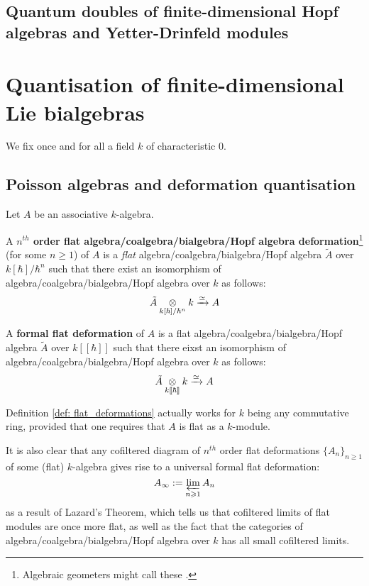     \subsection{Quantum doubles of finite-dimensional Hopf algebras and Yetter-Drinfeld modules}
    
\section{Quantisation of finite-dimensional Lie bialgebras}
    \begin{convention}
        We fix once and for all a field $k$ of characteristic $0$. 
    \end{convention}
    
    \subsection{Poisson algebras and deformation quantisation}
        \begin{definition} \label{def: flat_deformations}
            Let $A$ be an associative $k$-algebra.
            
            A \textbf{$n^{th}$ order flat algebra/coalgebra/bialgebra/Hopf algebra deformation}\footnote{Algebraic geometers might call these .} (for some $n \geq 1$) of $A$ is a \textit{flat} algebra/coalgebra/bialgebra/Hopf algebra $\tilde{A}$ over $k[\hbar]/\hbar^n$ such that there exist an isomorphism of algebra/coalgebra/bialgebra/Hopf algebra over $k$ as follows:
                $$\tilde{A} \tensor_{k[\hbar]/\hbar^n} k \xrightarrow[]{\cong} A$$
                
            A \textbf{formal flat deformation} of $A$ is a flat algebra/coalgebra/bialgebra/Hopf algebra $\tilde{A}$ over $k[\![\hbar]\!]$ such that there eixst an isomorphism of algebra/coalgebra/bialgebra/Hopf algebra over $k$ as follows:
                $$\tilde{A} \tensor_{k[\![\hbar]\!]} k \xrightarrow[]{\cong} A$$
        \end{definition}
        \begin{remark}
            Definition \ref{def: flat_deformations} actually works for $k$ being any commutative ring, provided that one requires that $A$ is flat as a $k$-module. 
            
            It is also clear that any cofiltered diagram of $n^{th}$ order flat deformations $\{A_n\}_{n \geq 1}$ of some (flat) $k$-algebra gives rise to a universal formal flat deformation:
                $$A_{\infty} := \projlim_{n \geq 1} A_n$$
            as a result of Lazard's Theorem, which tells us that cofiltered limits of flat modules are once more flat, as well as the fact that the categories of algebra/coalgebra/bialgebra/Hopf algebra over $k$ has all small cofiltered limits. 
        \end{remark}
